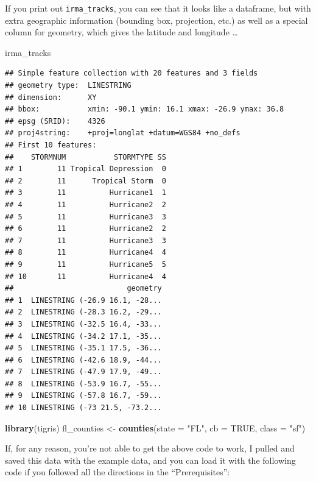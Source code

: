 \documentclass[]{tufte-book}
\newenvironment{Shaded}{}{}
\newcommand{\DataTypeTok}[1]{\textcolor[rgb]{0.56,0.13,0.00}{#1}}
\newcommand{\KeywordTok}[1]{\textcolor[rgb]{0.00,0.44,0.13}{\textbf{#1}}}
\newcommand{\NormalTok}[1]{#1}
\newcommand{\OtherTok}[1]{\textcolor[rgb]{0.00,0.44,0.13}{#1}}
\newcommand{\StringTok}[1]{\textcolor[rgb]{0.25,0.44,0.63}{#1}}
\begin{document}
If you print out \texttt{irma\_tracks}, you can see that it looks like a dataframe, but with extra
geographic information (bounding box, projection, etc.) as well as a special column for
geometry, which gives the latitude and longitude \ldots{}

\begin{Shaded}
\begin{Highlighting}[]
\NormalTok{irma_tracks}
\end{Highlighting}
\end{Shaded}

\begin{verbatim}
## Simple feature collection with 20 features and 3 fields
## geometry type:  LINESTRING
## dimension:      XY
## bbox:           xmin: -90.1 ymin: 16.1 xmax: -26.9 ymax: 36.8
## epsg (SRID):    4326
## proj4string:    +proj=longlat +datum=WGS84 +no_defs
## First 10 features:
##    STORMNUM           STORMTYPE SS
## 1        11 Tropical Depression  0
## 2        11      Tropical Storm  0
## 3        11          Hurricane1  1
## 4        11          Hurricane2  2
## 5        11          Hurricane3  3
## 6        11          Hurricane2  2
## 7        11          Hurricane3  3
## 8        11          Hurricane4  4
## 9        11          Hurricane5  5
## 10       11          Hurricane4  4
##                          geometry
## 1  LINESTRING (-26.9 16.1, -28...
## 2  LINESTRING (-28.3 16.2, -29...
## 3  LINESTRING (-32.5 16.4, -33...
## 4  LINESTRING (-34.2 17.1, -35...
## 5  LINESTRING (-35.1 17.5, -36...
## 6  LINESTRING (-42.6 18.9, -44...
## 7  LINESTRING (-47.9 17.9, -49...
## 8  LINESTRING (-53.9 16.7, -55...
## 9  LINESTRING (-57.8 16.7, -59...
## 10 LINESTRING (-73 21.5, -73.2...
\end{verbatim}

\begin{Shaded}
\begin{Highlighting}[]
\KeywordTok{library}\NormalTok{(tigris)}
\NormalTok{fl_counties <-}\StringTok{ }\KeywordTok{counties}\NormalTok{(}\DataTypeTok{state =} \StringTok{"FL"}\NormalTok{, }\DataTypeTok{cb =} \OtherTok{TRUE}\NormalTok{, }
    \DataTypeTok{class =} \StringTok{"sf"}\NormalTok{)}
\end{Highlighting}
\end{Shaded}

If, for any reason, you're not able to get the above code to work, I pulled and saved this data
with the example data, and you can load it with the following code if you followed all the
directions in the ``Prerequisites'':
\end{document}
